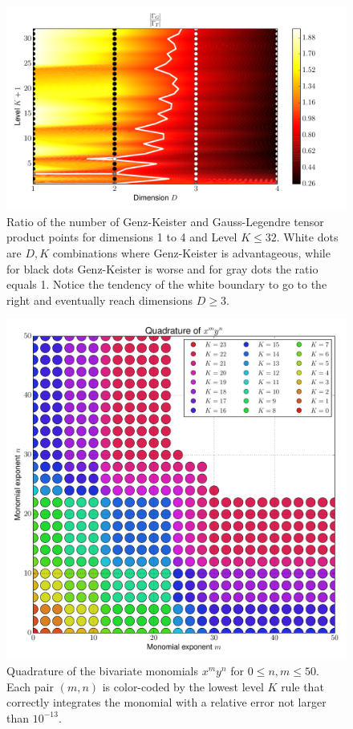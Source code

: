 \documentclass[a4paper,10pt]{article}
\begin{document}
\begin{figure}[h]
  \centering
  \includegraphics[width=0.8\linewidth]{./img/gk_legendre_ratio_large.pdf}
  \caption{Ratio of the number of Genz-Keister and Gauss-Legendre tensor product
  points for dimensions 1 to 4 and Level $K \leq 32$. White dots are $D,K$
  combinations where Genz-Keister is advantageous, while for black dots
  Genz-Keister is worse and for gray dots the ratio equals 1. Notice the tendency
  of the white boundary to go to the right and eventually reach dimensions $D \geq 3$.}
  \label{fig:gk_legendre_ratio_large}
\end{figure}

\begin{figure}[h]
  \centering
  \includegraphics[width=\linewidth]{./img/monomial_errors_legendre_2D.pdf}
  \caption{Quadrature of the bivariate monomials $x^m y^n$ for $0 \leq n, m \leq 50$.
  Each pair $(m,n)$ is color-coded by the lowest level $K$ rule that correctly
  integrates the monomial with a relative error not larger than $10^{-13}$.}
  \label{fig:monomial_errors_legendre_2D}
\end{figure}
\end{document}
